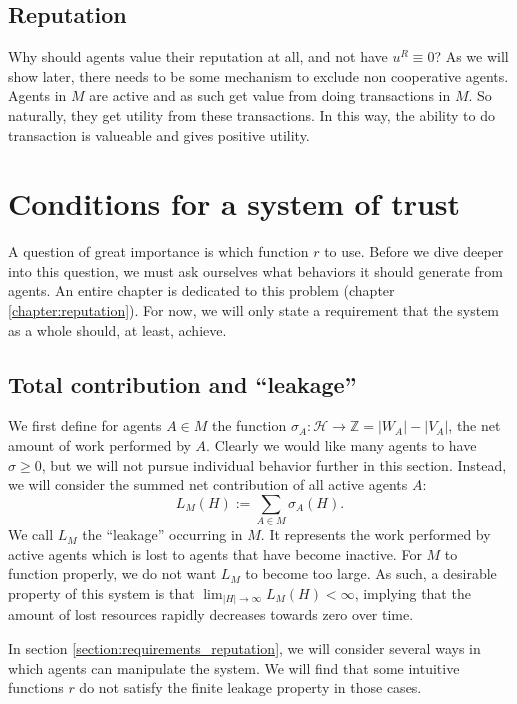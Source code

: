 \subsection{Reputation}
Why should agents value their reputation at all, 
and not have $u^R \equiv 0$? 
As we will show later, 
there needs to be some mechanism to exclude non cooperative agents. 
Agents in $M$ are active and as such get value from doing transactions in $M$. 
So naturally, they get utility from these transactions. 
In this way, the ability to do transaction is valueable and gives positive utility.

\section{Conditions for a system of trust}
A question of great importance is which function $r$ to use. 
Before we dive deeper into this question, 
we must ask ourselves what behaviors it should generate from agents. 
An entire chapter is dedicated to this problem (chapter \ref{chapter:reputation}). 
For now, we will only state a requirement that the system as a whole should, at least, achieve.

\subsection{Total contribution and ``leakage''}
We first define for agents $A \in M$ the function $\sigma_A: \mathcal{H} \to \mathds{Z} = |W_A| - |V_A|$, the net amount of work performed by $A$. 
Clearly we would like many agents to have $\sigma \geq 0$, 
but we will not pursue individual behavior further in this section. 
Instead, we will consider the summed net contribution of all active agents $A$:
\[L_M(H) := \sum_{A \in M} \sigma_A(H).\]
We call $L_M$ the ``leakage'' occurring in $M$. 
It represents the work performed by active agents which is lost to agents that have become inactive. 
For $M$ to function properly, 
we do not want $L_M$ to become too large. 
As such, a desirable property of this system is that $\lim_{|H| \to \infty} L_M(H) < \infty$, 
implying that the amount of lost resources rapidly decreases towards zero over time. 

In section \ref{section:requirements_reputation}, we will consider several ways in which agents can manipulate the system. 
We will find that some intuitive functions $r$ do not satisfy the finite leakage property in those cases.

